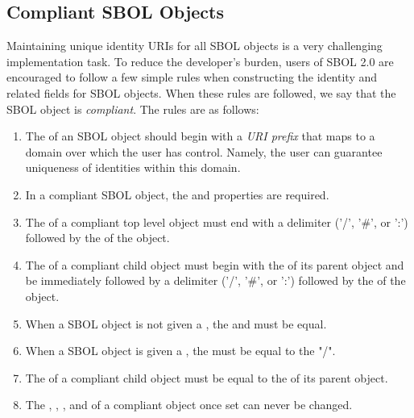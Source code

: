 
\subsection{Compliant SBOL Objects}
\label{sec:compliant}


Maintaining unique identity URIs for all SBOL objects is a very challenging implementation task.  To reduce the developer's burden, users of SBOL 2.0 are encouraged to follow a few simple rules when constructing the identity and related fields for SBOL objects.  When these rules are followed, we say that the SBOL object is \emph{compliant}.  The rules are as follows:
\begin{enumerate}
\item The  of an SBOL object should begin with a \emph{URI prefix} that maps to a domain over which the user has control.  Namely, the user can guarantee uniqueness of identities within this domain.
\item In a compliant SBOL object, the  and  properties are required.
\item The  of a compliant top level object must end with a delimiter ('/', '\#', or ':') followed by the  of the object. 
\item The  of a compliant child object must begin with the  of its parent object and be immediately followed by a delimiter ('/', '\#', or ':') followed by the  of the object.
\item When a SBOL object is not given a , the  and  must be equal.
\item When a SBOL object is given a , the  must be equal to the "/".
\item The  of a compliant child object must be equal to the  of its parent object.
\item The , , , and  of a compliant object once set can never be changed.
\end{enumerate}

